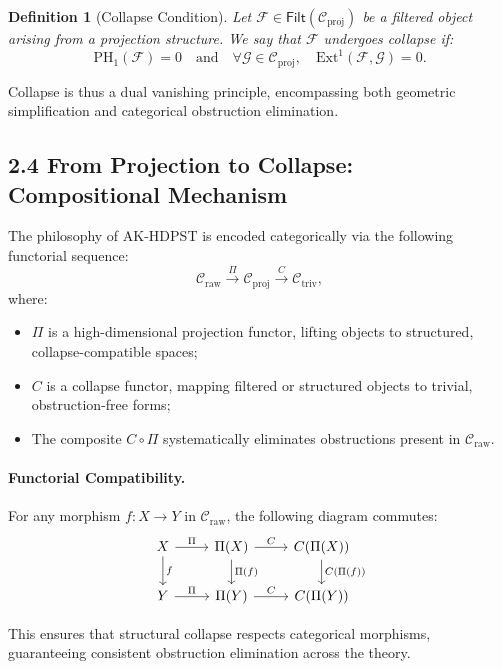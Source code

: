 \documentclass[11pt]{article}
\newtheorem{definition}[theorem]{Definition}
\begin{document}
\begin{definition}[Collapse Condition]
Let \( \mathcal{F} \in \mathsf{Filt}(\mathcal{C}_{\mathrm{proj}}) \) be a filtered object arising from a projection structure.  
We say that \( \mathcal{F} \) undergoes \emph{collapse} if:
\[
\mathrm{PH}_1(\mathcal{F}) = 0 \quad \text{and} \quad \forall \mathcal{G} \in \mathcal{C}_{\mathrm{proj}}, \quad \mathrm{Ext}^1(\mathcal{F}, \mathcal{G}) = 0.
\]
\end{definition}

Collapse is thus a dual vanishing principle, encompassing both geometric simplification and categorical obstruction elimination.

\subsection*{2.4 From Projection to Collapse: Compositional Mechanism}

The philosophy of AK-HDPST is encoded categorically via the following functorial sequence:
\[
\mathcal{C}_{\mathrm{raw}} 
\overset{\Pi}{\longrightarrow} 
\mathcal{C}_{\mathrm{proj}} 
\overset{C}{\longrightarrow} 
\mathcal{C}_{\mathrm{triv}},
\]
where:

\begin{itemize}
    \item \( \Pi \) is a high-dimensional projection functor, lifting objects to structured, collapse-compatible spaces;
    \item \( C \) is a collapse functor, mapping filtered or structured objects to trivial, obstruction-free forms;
    \item The composite \( C \circ \Pi \) systematically eliminates obstructions present in \( \mathcal{C}_{\mathrm{raw}} \).
\end{itemize}

\paragraph{Functorial Compatibility.}  
For any morphism \( f : X \to Y \) in \( \mathcal{C}_{\mathrm{raw}} \), the following diagram commutes:
\[
\begin{tikzcd}
X \arrow[d, "f"] \arrow[r, "\Pi"] & \Pi(X) \arrow[d, "\Pi(f)"] \arrow[r, "C"] & C(\Pi(X)) \arrow[d, "C(\Pi(f))"] \\
Y \arrow[r, "\Pi"] & \Pi(Y) \arrow[r, "C"] & C(\Pi(Y))
\end{tikzcd}
\]

This ensures that structural collapse respects categorical morphisms, guaranteeing consistent obstruction elimination across the theory.
\end{document}
